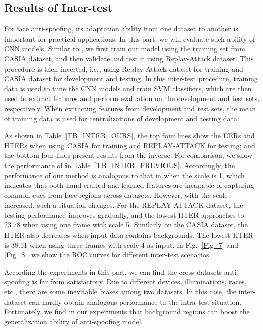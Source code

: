 \documentclass[letterpaper, 10 pt, conference]{ieeeconf}
\begin{document}
\subsection{Results of Inter-test}

For face anti-spoofing, its adaptation ability from one dataset to another is important for practical applications. In this part, we will evaluate such ability of CNN models. Similar to \cite{Face_Anti_Spoofing_Pereira_2013}, we first train our model using the training set from CASIA dataset, and then validate and test it using Replay-Attack dataset. This procedure is then inverted, i.e., using Replay-Attack dataset for training and CASIA dataset for development and testing. In this inter-test procedure, training data is used to tune the CNN models and train SVM classifiers, which are then used to extract features and perform evaluation on the development and test sets, respectively. When extracting features from development and test sets, the mean of training data is used for centralizations of development and testing data.

As shown in Table~\ref{TB_INTER_OURS}, the top four lines show the EERs and HTERs when using CASIA for training and REPLAY-ATTACK for testing; and the bottom four lines present results from the inverse. For comparison, we show the performance of \cite{} in Table~\ref{TB_INTER_PREVIOUS}. Accordingly, the performance of our method is analogous to that in \cite{Face_Anti_Spoofing_Pereira_2013} when the scale is 1, which indicates that both hand-crafted and learned features are incapable of capturing common cues from face regions across datasets. However, with the scale increased, such a situation changes. For the REPLAY-ATTACK dataset, the testing performance improves gradually, and the lowest HTER approaches to 23.78 when using one frame with scale 5. Similarly on the CASIA dataset, the HTER also decreases when input data contains backgrounds. The lowest HTER is 38.11 when using three frames with scale 4 as input. In Fig.~\ref{Fig_7} and \ref{Fig_8}, we show the ROC curves for different inter-test scenarios.
  
According the experiments in this part, we can find the cross-datasets anti-spoofing is far from satisfactory. Due to different devices, illuminations, races, etc., there are some inevitable biases among two datasets. In this case, the inter-dataset can hardly obtain analogous performance to the intra-test situation. Fortunately, we find in our experiments that background regions can boost the generalization ability of anti-spoofing model.
\end{document}
